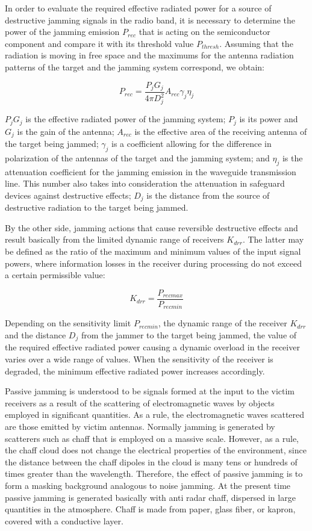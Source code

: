 \documentclass[english,purist]{ist-report}
\begin{document}
In order to evaluate the required effective radiated power for a source of destructive jamming signals in the radio band, it is necessary to determine the power of the jamming emission $P_{rec}$ that is acting on the semiconductor component and compare it with its threshold value $P_{thresh}$. Assuming that the radiation is moving in free space and the maximums for the antenna radiation patterns of the target and the jamming system correspond, we obtain:

\begin{equation*}
P_{rec}= \frac{P_j G_j}{4 \pi D_j ^2} A_{rec} \gamma_j \eta_j    
\end{equation*}

$P_j G_j$ is the effective radiated power of the jamming system; $P_j$ is its power and $G_j$ is the gain of the antenna; $A_{rec}$ is the effective area of the receiving antenna of the target being jammed; $\gamma_{j}$ is a coefficient allowing for the difference in polarization of the antennas of the target and the jamming system; and $\eta_j$ is the attenuation coefficient for the jamming emission in the waveguide transmission line. This number also takes into consideration the attenuation in safeguard devices against destructive effects; $D_j$ is the distance from the source of destructive radiation to the target being jammed. 

By the other side, jamming actions that cause reversible destructive effects and result basically from the limited dynamic range of receivers $K_{drr}$. The latter may be defined as the ratio of the maximum and minimum values of the input signal powers, where information losses in the receiver during processing do not exceed a certain permissible value:

\begin{equation*}
K_{drr}= \frac{P_{rec max}}{P_{rec min}}    
\end{equation*}

Depending on the sensitivity limit $P_{rec min}$, the dynamic range of the receiver $K_{drr}$ and the distance $D_j$ from the jammer to the target being jammed, the value of the required effective radiated power causing a dynamic overload in the receiver varies over a wide range of values. When the sensitivity of the receiver is degraded, the minimum effective radiated power increases accordingly.

Passive jamming is understood to be signals formed at the input to the
victim receivers as a result of the scattering of electromagnetic waves by objects employed in significant quantities. As a rule, the electromagnetic waves scattered are those emitted by victim antennas.
Normally jamming is generated by scatterers such as chaff that is
employed on a massive scale. However, as a rule, the chaff cloud does not change the electrical properties of the environment, since the distance between the chaff dipoles in the cloud is many tens or hundreds of times greater than the wavelength.
Therefore, the effect of passive jamming is to form a masking background analogous to noise jamming. At the present time passive jamming is generated basically with anti radar chaff, dispersed in large quantities in the atmosphere.
Chaff is made from paper, glass fiber, or kapron, covered with a
conductive layer.
\end{document}

